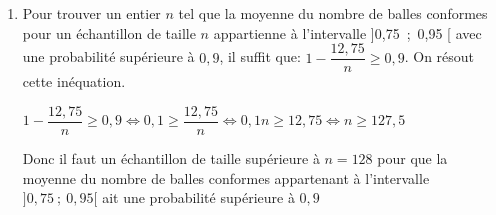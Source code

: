\begin{enumerate}
\begin{enumerate}

On déduit donc:
$P(0,75 < M_n < 0,95) \geqslant  1 - \dfrac{12,75}{n}$.

		\item Pour trouver un entier $n$ tel que la moyenne du nombre de balles conformes pour un échantillon de taille $n$ appartienne à l'intervalle ]0,75~;~0,95 [ avec une probabilité supérieure à $0,9$, il suffit que: $1 - \dfrac{12,75}{n}\geqslant 0,9$.
On résout cette inéquation.

$1 - \dfrac{12,75}{n}\geqslant 0,9
 \iff 0,1\geqslant \dfrac{12,75}{n}
\iff 0,1n \geqslant 12,75
\iff n \geqslant 127,5$

Donc il faut un échantillon de taille supérieure à $n=128$ pour  que  la moyenne du nombre de balles conformes  appartenant à l'intervalle $]0,75~;~0,95[$ ait une probabilité supérieure à $0,9$
	\end{enumerate}
\end{enumerate}

\vspace{0,5cm}
